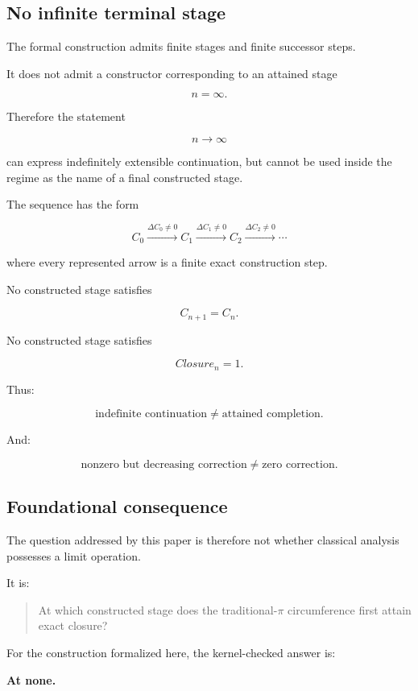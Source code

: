 \documentclass[11pt,a4paper]{article}
\begin{document}
\subsection{No infinite terminal stage}

The formal construction admits finite stages and finite successor
steps.

It does not admit a constructor corresponding to an attained stage

\[
n=\infty.
\]

Therefore the statement

\[
n\to\infty
\]

can express indefinitely extensible continuation, but cannot be used
inside the regime as the name of a final constructed stage.

The sequence has the form

\[
C_0
\xrightarrow{\Delta C_0\neq0}
C_1
\xrightarrow{\Delta C_1\neq0}
C_2
\xrightarrow{\Delta C_2\neq0}
\cdots
\]

where every represented arrow is a finite exact construction step.

No constructed stage satisfies

\[
C_{n+1}=C_n.
\]

No constructed stage satisfies

\[
Closure_n=1.
\]

Thus:

\[
\boxed{
\text{indefinite continuation}
\neq
\text{attained completion}.
}
\]

And:

\[
\boxed{
\text{nonzero but decreasing correction}
\neq
\text{zero correction}.
}
\]

\subsection{Foundational consequence}

The question addressed by this paper is therefore not whether classical
analysis possesses a limit operation.

It is:

\begin{quote}
At which constructed stage does the traditional-\(\pi\) circumference
first attain exact closure?
\end{quote}

For the construction formalized here, the kernel-checked answer is:

\begin{center}
\textbf{At none.}
\end{center}
\end{document}
